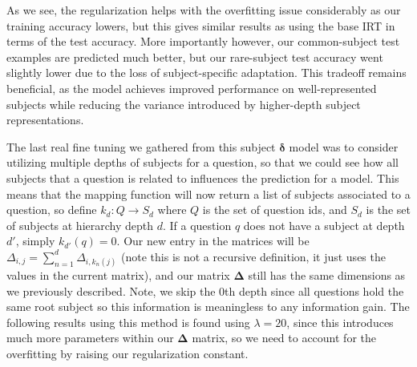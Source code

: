 \documentclass[11pt]{article}
\begin{document}
As we see, the regularization helps with the overfitting issue considerably as our training accuracy lowers, but this gives similar results as using the base IRT in terms of the test accuracy. More importantly however, our common-subject test examples are predicted much better, but our rare-subject test accuracy went slightly lower due to the loss of subject-specific adaptation. This tradeoff remains beneficial, as the model achieves improved performance on well-represented subjects while reducing the variance introduced by higher-depth subject representations.

The last real fine tuning we gathered from this subject $\boldsymbol{\delta}$ model was to consider utilizing multiple depths of subjects for a question, so that we could see how all subjects that a question is related to influences the prediction for a model. This means that the mapping function will now return a list of subjects associated to a question, so define $k_d : Q \to S_d$ where $Q$ is the set of question ids, and $S_d$ is the set of subjects at hierarchy depth $d$. If a question $q$ does not have a subject at depth $d'$, simply $k_{d'}(q) = 0$. Our new entry in the matrices will be $\Delta_{i,j} = \sum_{n=1}^{d}{\Delta_{i,k_n(j)}}$ (note this is not a recursive definition, it just uses the values in the current matrix), and our matrix $\boldsymbol{\Delta}$ still has the same dimensions as we previously described. Note, we skip the 0th depth since all questions hold the same root subject so this information is meaningless to any information gain. The following results using this method is found using $\lambda = 20$, since this introduces much more parameters within our $\boldsymbol{\Delta}$ matrix, so we need to account for the overfitting by raising our regularization constant.
\end{document}
